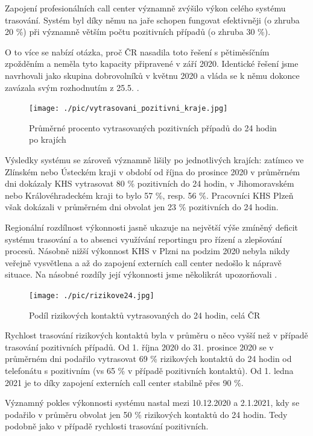 Zapojení profesionálních call center významně zvýšilo výkon celého systému trasování. Systém byl díky němu na jaře schopen fungovat efektivněji (o zhruba 20 \%) při významně větším počtu pozitivních případů (o zhruba 30 \%).

O to více se nabízí otázka, proč ČR nasadila toto řešení s pětiměsíčním zpožděním a neměla tyto kapacity připravené v září 2020. Identické řešení jsme navrhovali jako skupina dobrovolníků v květnu 2020 \cite{tr_hlidac02} a vláda se k němu dokonce zavázala svým rozhodnutím z 25.5. \cite{tr_vlada01}.

\begin{figure}[ht]
    \centering
    \texttt{[image: ./pic/vytrasovani\_pozitivni\_kraje.jpg]}
    \caption{Průměrné procento vytrasovaných pozitivních případů do 24 hodin po krajích}
    \label{fig:pozitivni24_3}
\end{figure}

Výsledky systému se zároveň významně lišily po jednotlivých krajích: zatímco ve Zlínském nebo Ústeckém kraji v období od října do prosince 2020 v průměrném dni dokázaly KHS vytrasovat 80 \% pozitivních do 24 hodin, v Jihomoravském nebo Královéhradeckém kraji to bylo 57 \%, resp. 56 \%. Pracovníci KHS Plzeň však dokázali v průměrném dni obvolat jen 23 \% pozitivních do 24 hodin.

Regionální rozdílnost výkonnosti jasně ukazuje na největší výše zmíněný deficit systému trasování a to absenci využívání reportingu pro řízení a zlepšování procesů. Násobně nižší výkonnost KHS v Plzni na podzim 2020 nebyla nikdy veřejně vysvětlena a až do zapojení externích call center nedošlo k nápravě situace. Na násobné rozdíly její výkonnosti jsme několikrát upozorňovali \cite{tr_bisop03}.

\begin{figure}[ht]
    \centering
    \texttt{[image: ./pic/rizikove24.jpg]}
    \caption{Podíl rizikových kontaktů vytrasovaných do 24 hodin, celá ČR}
    \label{fig:rizikove24}
\end{figure}

Rychlost trasování rizikových kontaktů byla v průměru o něco vyšší než v případě trasování pozitivních případů. Od 1. října 2020 do 31. prosince 2020 se v průměrném dni podařilo vytrasovat 69 \% rizikových kontaktů do 24 hodin od telefonátu s pozitivním (vs 65 \% v případě pozitivních kontaktů). Od 1. ledna 2021 je to díky zapojení externích call center stabilně přes 90 \%.

Významný pokles výkonnosti systému nastal mezi 10.12.2020 a 2.1.2021, kdy se podařilo v průměru obvolat jen 50 \% rizikových kontaktů do 24 hodin. Tedy podobně jako v případě rychlosti trasování pozitivních.

